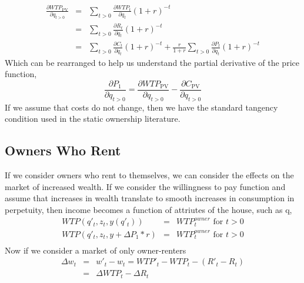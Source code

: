 \documentclass[ecta,nameyear,draft]{econsocart}
\theoremstyle{plain}
\theoremstyle{remark}
\begin{document}
\begin{eqnarray}
\frac{\partial \mathit{WTP}_{\mathrm{PV}}}{\partial q_{t>0}}&=&\sum_{t>0} \frac{\partial \mathit{WTP}_t}{\partial q_t}(1+r)^{-t}\\ \label{pvmwtp}
&=&\sum_{t>0} \frac{\partial R_t}{\partial q_t}(1+r)^{-t}\nonumber\\
&=&\sum_{t>0} \frac{\partial C_t}{\partial q_t}(1+r)^{-t}+\frac{r}{1+r}\sum_{t>0} \frac{\partial P_t}{\partial q_t}(1+r)^{-t}\nonumber
\end{eqnarray}
Which can be rearranged to help us understand the partial derivative of the price function,
\begin{equation}
	\frac{\partial P_1} {\partial q_{t>0}}=\frac{\partial \mathit{WTP}_{\mathrm{PV}}}{\partial q_{t>0}}-\frac{\partial C_{\mathrm{PV}}}{\partial q_{t>0}}
\end{equation}
If we assume that costs do not change, then we have the standard tangency condition used in the static ownership literature.

\subsection{Owners Who Rent}
If we consider owners who rent to themselves, we can consider the effects on the market of increased wealth.
If we consider the willingness to pay function and assume that increases in wealth translate to smooth increases in consumption in perpetuity, then income becomes a function of attriutes of the house, such as q, 
\begin{eqnarray}
	\mathit{WTP}(q'_t,z_t,y(q'_t))&=&\mathit{WTP}_t^{\mathit{owner}} \text{ for } t>0\\
	\mathit{WTP}(q'_t,z_t,y+\Delta P_1*r)&=&\mathit{WTP}_t^{\mathit{owner}} \text{ for } t>0\\
\end{eqnarray}
Now if we consider a market of only owner-renters
\begin{eqnarray}
\Delta w_t&=&w'_t-w_t=WTP'_t-WTP_t-(R'_t-R_t)\\
&=&\Delta\mathit{WTP}_t-\Delta R_t
\end{eqnarray}
\end{document}
